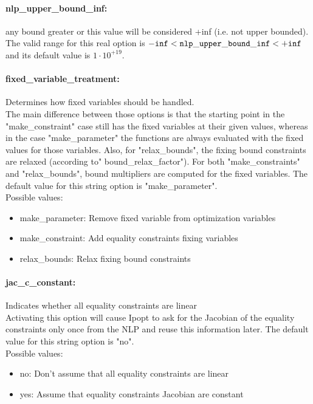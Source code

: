 \paragraph{nlp\_upper\_bound\_inf:}\label{opt:nlp_upper_bound_inf} any bound greater or this value will be considered +inf (i.e. not upper bounded). \\
 The valid range for this real option is 
${\tt -inf} <  {\tt nlp\_upper\_bound\_inf } <  {\tt +inf}$
and its default value is $1 \cdot 10^{+19}$.


\paragraph{fixed\_variable\_treatment:}\label{opt:fixed_variable_treatment} Determines how fixed variables should be handled. \\
 The main difference between those options is that the starting point in the "make\_constraint" case still has the fixed variables at their given values, whereas in the case "make\_parameter" the functions are always evaluated with the fixed values for those variables.  Also, for "relax\_bounds", the fixing bound constraints are relaxed (according to" bound\_relax\_factor"). For both "make\_constraints" and "relax\_bounds", bound multipliers are computed for the fixed variables. The default value for this string option is "make\_parameter".
\\ 
Possible values:
\begin{itemize}
   \item make\_parameter: Remove fixed variable from optimization variables
   \item make\_constraint: Add equality constraints fixing variables
   \item relax\_bounds: Relax fixing bound constraints
\end{itemize}

\paragraph{jac\_c\_constant:}\label{opt:jac_c_constant} Indicates whether all equality constraints are linear \\
 Activating this option will cause Ipopt to ask for the Jacobian of the equality constraints only once from the NLP and reuse this information later. The default value for this string option is "no".
\\ 
Possible values:
\begin{itemize}
   \item no: Don't assume that all equality constraints are linear
   \item yes: Assume that equality constraints Jacobian are constant
\end{itemize}

